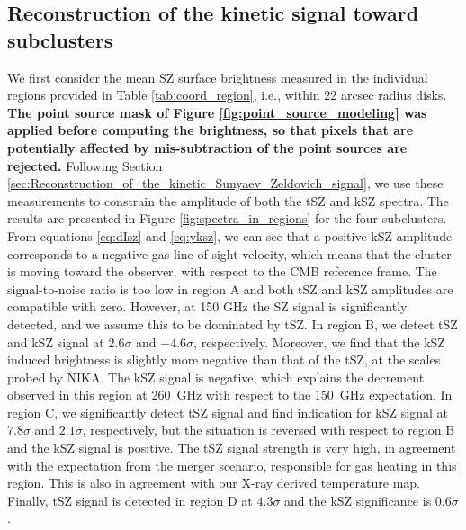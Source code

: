 \documentclass[twocolumn,traditabstract]{aa}
\begin{document}
\subsection{Reconstruction of the kinetic signal toward subclusters}\label{sec:Reconstruction_of_the_kinetic_signal_toward_sub_clusters}
We first consider the mean SZ surface brightness measured in the individual regions provided in Table \ref{tab:coord_region}, i.e., within 22 arcsec radius disks. {\bf The point source mask of Figure \ref{fig:point_source_modeling} was applied before computing the brightness, so that pixels that are potentially affected by mis-subtraction of the point sources are rejected.} Following Section \ref{sec:Reconstruction_of_the_kinetic_Sunyaev_Zeldovich_signal}, we use these measurements to constrain the amplitude of both the tSZ and kSZ spectra. The results are presented in Figure \ref{fig:spectra_in_regions} for the four subclusters. From equations \ref{eq:dIsz} and \ref{eq:yksz}, we can see that a positive kSZ amplitude corresponds to a negative gas line-of-sight velocity, which means that the cluster is moving toward the observer, with respect to the CMB reference frame. The signal-to-noise ratio is too low in region A and both tSZ and kSZ amplitudes are compatible with zero. However, at 150 GHz the SZ signal is significantly detected, and we assume this to be dominated by tSZ. In region B, we detect tSZ and kSZ signal at $2.6 \sigma$ and $-4.6 \sigma$, respectively. Moreover, we find that the kSZ induced brightness is slightly more negative than that of the tSZ, at the scales probed by NIKA. The kSZ signal is negative, which explains the decrement observed in this region at 260~GHz with respect to the 150~GHz expectation. In region C, we significantly detect tSZ signal and find indication for kSZ signal at $7.8 \sigma$ and $2.1 \sigma$, respectively, but the situation is reversed with respect to region B and the kSZ signal is positive. The tSZ signal strength is very high, in agreement with the expectation from the merger scenario, responsible for gas heating in this region. This is also in agreement with our X-ray derived temperature map. Finally, tSZ signal is detected in region D at $4.3 \sigma$ and the kSZ significance is $0.6 \sigma$.
\end{document}
